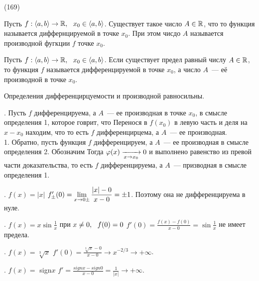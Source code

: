 (169)

\Op Пусть $f: \langle a, b \rangle \to\mathbb{R},\ \  x_0 \in \langle a, b \rangle$. Существует такое число $A \in \mathbb{R}$, что  то функция называется диффернцируемой в точке $x_0$. При этом чисдо $A$ называется производной фугкции $f$ точке $x_0$.

\Op Пусть $f: \langle a, b \rangle \to \mathbb{R},\ \  x_0\in \langle a, b \rangle$. Если существует предел  равный числу $A \in \mathbb{R}$, то функция $f$ называется дифференцируемой в точке $x_0$, а число $A$~--- её производной в точке $x_0$.

\T Определения дифференцирцуемости и производной равносильны.

. Пусть $f$ дифференцируема, а $A$~--- ее производная в точке $x_0$, в смысле определения 1, которое говрит, что  Перенося в $f(x_0)$ в левую часть и деля на $x - x_0$ находим, что  то есть $f$ дифференцирцема, а $A$~--- ее производная.\\
1. Обратно, пусть функция $f$ дифференцируем, а $A$~--- ее производная в смысле определения 2. Обозначим  Тогда $\varphi(x) \xrightarrow[x\to x_0]{} 0$ и выполнено равенство из превой части доказательства, то есть $f$ дифференцируема, а $A$~--- призводная в смысле определения 1.

. $f(x) = |x|$ $f'_\pm(0) = \displaystyle \lim\limits^{}_{x \to 0\pm}\frac{|x| - 0}{x - 0} = \pm 1$. Поэтому она не дифференцируема в нуле.

. $f(x) = x \sin \frac 1x$ при $x \neq 0,\ \  f(0) = 0$ $f'(0) = \frac{f(x) - f(0)}{x - 0} = \sin \frac 1x$ не имеет предела.

. $f(x) = \sqrt[3]{x}$ $f'(0) = \frac{\sqrt[3]{x} - 0}{x - 0} \to x^{-2/3} \to +\infty$.

. $f(x) =$ sign$x$ $f' = \frac{\textit{sign}x - \textit{sign}0}{x - 0} = \frac 1{|x|} \to +\infty$.